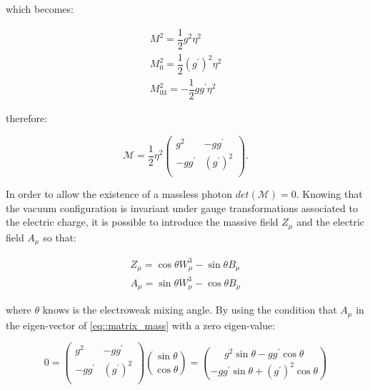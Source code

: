 which becomes:

\begin{equation}
\begin{array}{c}
M^{2}  = \dfrac{1}{2} g^{2} \eta^{2}\\
M_{0}^{2}  = \dfrac{1}{2} (g^{\prime})^{2} \eta^{2}\\
M_{03}^{2}  = -\dfrac{1}{2} gg^{\prime} \eta^{2}
\end{array}
\end{equation}

therefore:

\begin{equation}
\mathcal{M} =  \dfrac{1}{2} \eta^{2}
\begin{pmatrix}
 g^{2} & -gg^{\prime} \\
-gg^{\prime} & (g^{\prime})^{2} \\
\end{pmatrix}.
\label{eq::matrix_mass}
\end{equation}

In order to allow the existence of a massless photon $det(\mathcal{M}) = 0$. Knowing that the vacuum configuration is invariant under gauge transformations associated to the electric charge, it is possible to introduce the massive field $Z_{\mu}$ and the electric field $A_{\mu}$ so that:

\begin{equation}
\begin{array}{c}
Z_{\mu} = \cos\theta W^{3}_{\mu} -\sin\theta B_{\mu}\\
A_{\mu} =\sin\theta W^{3}_{\mu} - \cos\theta B_{\mu}

\end{array}
\label{eq::fields_rotation}
\end{equation}

where $\theta$ knows is the electroweak mixing angle. By using the condition that $A_{\mu}$ in the eigen-vector of \autoref{eq::matrix_mass} with a zero eigen-value:

\begin{equation}
0 = 
\begin{pmatrix}
g^{2} & -gg^{\prime} \\
-gg^{\prime} & (g^{\prime})^{2} \\
\end{pmatrix}
\binom{\sin\theta}{\cos\theta}
=
\binom{g^{2}\sin\theta - gg^{\prime}\cos\theta}{-gg^{\prime}\sin\theta + (g^{\prime})^{2}\cos\theta}
\label{eq::matrix_rotation}
\end{equation}

